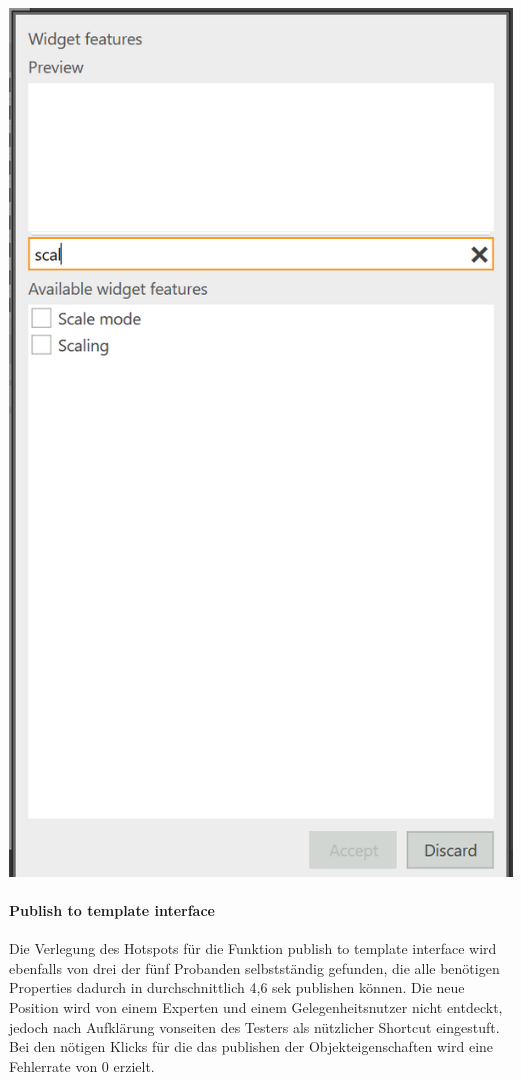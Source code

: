 \begin{center}
  \includegraphics[scale= 0.6]{figures/Feature_Test.PNG}
  \label{fig:Feature_Test}
\end{center}

\paragraph{Publish to template interface}
Die Verlegung des Hotspots für die Funktion \glqq publish to template interface\grqq{} wird ebenfalls von drei der fünf Probanden selbstständig gefunden, die alle benötigen Properties dadurch in durchschnittlich 4,6 sek publishen können.
Die neue Position wird von einem Experten und einem Gelegenheitsnutzer nicht entdeckt, jedoch nach Aufklärung vonseiten des Testers als nützlicher Shortcut eingestuft.
Bei den nötigen Klicks für die das publishen der Objekteigenschaften wird eine Fehlerrate von 0 erzielt.

